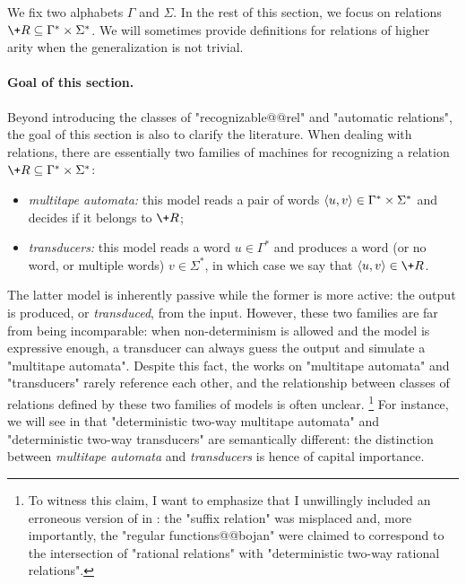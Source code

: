 We fix two alphabets $\Gamma$ and $\Sigma$. In the rest of this section, we focus
on relations $\+R \subseteq \Gamma^* \times \Sigma^*$. We will sometimes provide definitions
for relations of higher arity when the generalization is not trivial.

\paragraph*{Goal of this section.}
Beyond introducing the classes of "recognizable@@rel" and "automatic relations", the goal of
this section is also to clarify the literature. When dealing with relations, there are essentially 
two families of machines for recognizing a relation $\+R \subseteq \Gamma^* \times \Sigma^*$:
\begin{itemize}
	\item \emph{multitape automata:} this model reads a pair of words $\langle u,v\rangle \in \Gamma^* \times \Sigma^*$ and decides if it belongs to $\+R$;
	\item \emph{transducers:} this model reads a word $u \in \Gamma^*$ and produces a word (or no word, or multiple words) $v\in \Sigma^*$, in which case we say that $\tup{u,v} \in \+R$.  
\end{itemize}
The latter model is inherently passive while the former is more active: the output is produced,
or \emph{transduced}, from the input. However, these two families are far from being incomparable:
when non-determinism is allowed and the model is expressive enough, a transducer can always guess the output and simulate a "multitape automata". Despite this fact, the works on "multitape automata" and "transducers" rarely reference each other, and the relationship between classes
of relations defined by these two families of models is often unclear.%
\footnote{To witness this claim, I want to emphasize that I unwillingly included an erroneous 
version of  in \cite{Morvan2025Algebras}:
the "suffix relation" was misplaced and, more
importantly, the "regular functions@@bojan" were claimed to correspond to
the intersection of "rational relations" with "deterministic two-way rational relations".}
For instance, we will see in 
that "deterministic two-way multitape automata"
and "deterministic two-way transducers" are semantically different: the distinction
between \emph{multitape automata} and \emph{transducers} is hence of capital importance.

